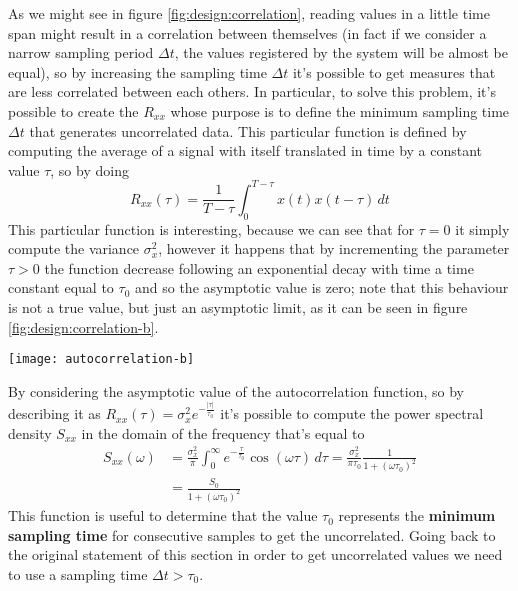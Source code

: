 		As we might see in figure \ref{fig:design:correlation}, reading values in a little time span might result in a correlation between themselves (in fact if we consider a narrow sampling period $\Delta t$, the values registered by the system will be almost be equal), so by increasing the sampling time $\Delta t$ it's possible to get measures that are less correlated between each others. In particular, to solve this problem, it's possible to create the  $R_{xx}$ whose purpose is to define the minimum sampling time $\Delta t$ that generates uncorrelated data. This particular function is defined by computing the average of a signal with itself translated in time by a constant value $\tau$, so by doing
		\begin{equation}
			R_{xx}(\tau) = \frac 1{T-\tau} \int_0^{T-\tau} x(t) x(t-\tau) \, dt
		\end{equation}
		This particular function is interesting, because we can see that for $\tau = 0$ it simply compute the variance $\sigma_x^2$, however it happens that by incrementing the parameter $\tau > 0$ the function decrease following an exponential decay with time a time constant equal to $\tau_0$ and so the asymptotic value is zero; note that this behaviour is not a true value, but just an asymptotic limit, as it can be seen in figure \ref{fig:design:correlation-b}.
	
		\begin{SCfigure}[1][bht]
			\centering \texttt{[image: autocorrelation-b]}
			\caption{trend of the function $R_{xx}$ and $S_{xx}$ read by an instrument.} \label{fig:design:correlation-b}
		\end{SCfigure}
		
		By considering the asymptotic value of the autocorrelation function, so by describing it as $R_{xx}(\tau) = \sigma_x^2 e^{-\frac{|\tau|}{\tau_0}}$ it's possible to compute the power spectral density $S_{xx}$ in the domain of the frequency that's equal to
		\begin{equation}
		\begin{split}
			S_{xx}(\omega) & = \frac{\sigma_x^2}{\pi} \int_0^\infty e^{-\frac{\tau}{\tau_0}} \cos(\omega \tau)\, d\tau = \frac{\sigma_x^2}{\pi \tau_0} \frac 1 {1 + (\omega \tau_0)^2} \\ & = \frac{S_0}{1 + (\omega \tau_0)^2}
		\end{split}
		\end{equation}
		This function is useful to determine that the value $\tau_0$ represents the \textbf{minimum sampling time} for consecutive samples to get the uncorrelated. Going back to the original statement of this section in order to get uncorrelated values we need to use a sampling time $\Delta t > \tau_0$.
		
